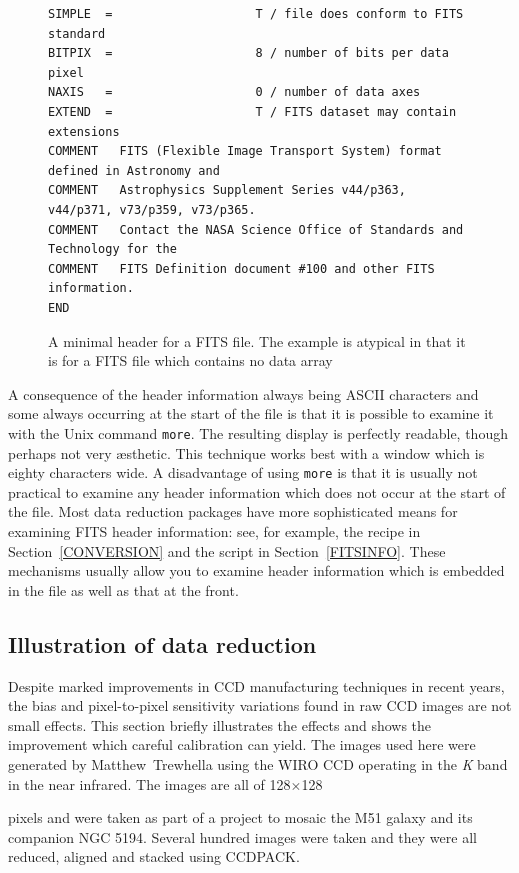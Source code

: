 \documentclass[twoside,11pt]{article}
\newcommand{\html}[1]{}
\newcommand{\latex}[1]{#1}
\begin{document}
\begin{figure}[htbp]

\begin{verbatim}
SIMPLE  =                    T / file does conform to FITS standard    
BITPIX  =                    8 / number of bits per data pixel    
NAXIS   =                    0 / number of data axes    
EXTEND  =                    T / FITS dataset may contain extensions    
COMMENT   FITS (Flexible Image Transport System) format defined in Astronomy and
COMMENT   Astrophysics Supplement Series v44/p363, v44/p371, v73/p359, v73/p365.
COMMENT   Contact the NASA Science Office of Standards and Technology for the   
COMMENT   FITS Definition document #100 and other FITS information.    
END                                                                       
\end{verbatim}

\begin{quote}
\caption[A minimal FITS file header]{A minimal header for a FITS
file.  The example is atypical in that it is for a FITS file which
contains no data array
\label{FITSHEAD} }
\end{quote}

\end{figure}

A consequence of the header information always being ASCII characters
and some always occurring at the start of the file is that it is possible
to examine it with the Unix command {\tt more}.  The resulting display is
perfectly readable, though perhaps not very \ae sthetic.  This technique
works best with a window which is eighty characters wide.  A disadvantage
of using {\tt more} is that it is usually not practical to examine any
header information which does not occur at the start of the file.  Most
data reduction packages have more sophisticated means for examining FITS
header information: see, for example, the recipe in Section~\ref{CONVERSION}
and the script in Section~\ref{FITSINFO}.  These mechanisms usually allow
you to examine header information which is embedded in the file as well
as that at the front.

\subsection{Illustration of data reduction}

Despite marked improvements in CCD manufacturing techniques in recent
years, the bias and pixel-to-pixel sensitivity variations found in raw
CCD images are not small effects.  This section briefly illustrates the
effects and shows the improvement which careful calibration can yield.
The images used here were generated by Matthew~Trewhella using the WIRO CCD
operating in the {\it K}\/ band in the near infrared.  The images are all of
\latex{128$\times$128}
\html{128x128}
pixels and were taken as part of a project to mosaic the M51 galaxy
and its companion NGC 5194.  Several hundred images were taken and they were
all reduced, aligned and stacked using CCDPACK.
\end{document}
